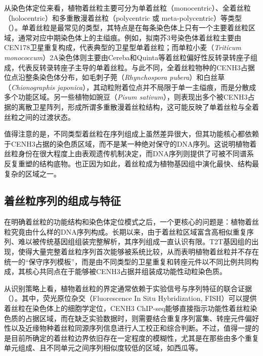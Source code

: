 从染色体定位来看，植物着丝粒主要可分为单着丝粒（monocentric）、全着丝粒（holocentric）和多重散漫着丝粒（polycentric 或 meta-polycentric）等类型（）。单着丝粒是最常见的类型，其特点是在每条染色体上只有一个主要着丝粒区域，通常对应中期染色体上的主缢痕。例如，拟南芥3号染色体着丝粒主要由CEN178卫星重复构成，代表典型的卫星型单着丝粒\cite{naish2021genetic, wlodzimierz2023cycles}；而单粒小麦（\textit{Triticum monococcum}）2A染色体则主要由Cereba和Quinta等着丝粒偏好性反转录转座子组成，代表反转录转座子主导的单着丝粒\cite{ahmed2023einkorn}。与此不同，全着丝粒物种的CENH3占据位点沿整条染色体分布，如毛刺子莞（\textit{Rhynchospora pubera}）\cite{marques2015holocentromeres}和白丝草（\textit{Chionographis japonica}）\cite{hofstatter2022repeat}，其动粒附着位点并不局限于单一主缢痕，而是分散成多个功能区域。另一些植物如豌豆（\textit{Pisum sativum}），则表现出多个被CENH3占据的离散卫星阵列，形成所谓多重散漫着丝粒结构\cite{macas2023assembly}，这可能反映了单着丝粒与全着丝粒之间的过渡状态。

值得注意的是，不同类型着丝粒在序列组成上虽然差异很大，但其功能核心都依赖于CENH3占据的染色质区域，而不是某一种绝对保守的DNA序列。这说明植物着丝粒身份在很大程度上由表观遗传机制决定，而DNA序列则提供了可被不同谱系反复重塑的结构底物。也正因为如此，着丝粒成为植物基因组中演化最快、结构最复杂的区域之一。

\subsection{着丝粒序列的组成与特征}

在明确着丝粒的功能结构和染色体定位模式之后，一个更核心的问题是：植物着丝粒究竟由什么样的DNA序列构成。长期以来，由于着丝粒区域富含高相似重复序列、难以被传统基因组组装完整解析，其序列组成一直认识有限。T2T基因组的出现，使得大量完整着丝粒序列首次能够被系统比较\cite{naish2021genetic, rabanal2022pushing, nurk2022complete}，从而表明植物着丝粒并不存在统一的“保守序列模板”，而是由不同类型的卫星重复和转座元件以不同比例共同构成\cite{ahmed2023einkorn, nagaki2005structure, naish2021genetic, sharma2014evolution, wlodzimierz2023cycles}，其核心共同点在于能够被CENH3占据并组装成功能性动粒染色质\cite{macas2023assembly, neumann2015centromeres}。

从识别策略上看，植物着丝粒的界定通常依赖于实验信号与序列特征的联合证据（）。其中，荧光原位杂交（Fluorescence In Situ Hybridization, FISH）可以提供着丝粒在染色体上的细胞学定位，CENH3 ChIP-seq能够直接指示功能性着丝粒染色质的占据区域，而在缺乏实验数据时，则需要结合重复序列富集、转座元件偏好性以及近缘物种着丝粒同源序列信息进行人工校正和综合判断。不过，值得一提的是目前所确定的着丝粒边界依旧存在一定程度的模糊性，尤其是在那些由多个重复单元组成、且不同单元之间序列相似度较低的区域，如西瓜等\cite{deng2022telomere}。

